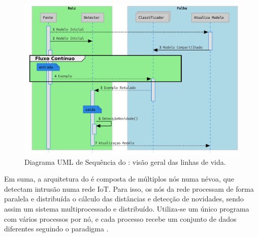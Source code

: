\begin{figure}[hb]
  \centerline{
    \includegraphics[width=0.80\linewidth,page=1]{figures/lifecycle-uml-svg.pdf}
  }
  \caption{Diagrama UML de Sequência do \mfog: visão geral das linhas de vida.}
  \label{fig:mfog-mpi-life}
\end{figure}

Em suma, a arquitetura do \mfog é composta de múltiplos nós numa névoa, que detectam
intrusão numa rede IoT. Para isso, os nós da rede processam de forma paralela e
distribuída o cálculo das distâncias e detecção de novidades, sendo assim um
sistema multiprocessado e distribuído. Utiliza-se um único programa com vários
processos por nó, e cada processo recebe um conjunto de dados diferentes
seguindo o paradigma \spmd.

